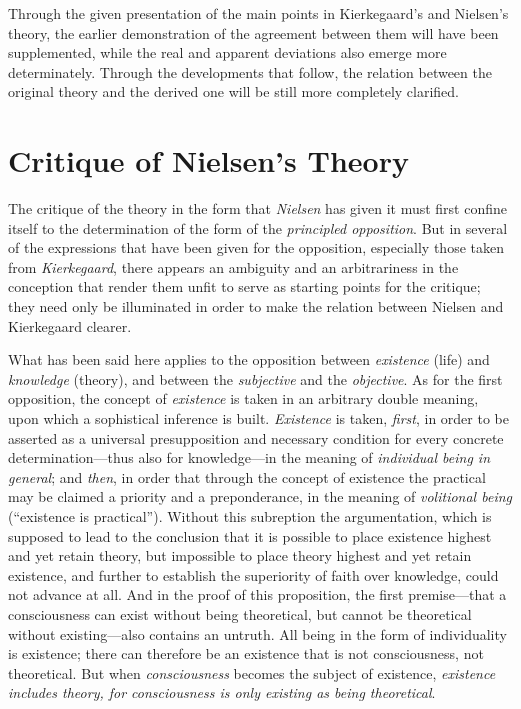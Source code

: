 \documentclass[12pt,a4paper]{book}
\begin{document}
Through the given presentation of the main points in Kierkegaard's and
Nielsen's theory, the earlier demonstration of the agreement between
them will have been supplemented, while the real and apparent deviations
also emerge more determinately. Through the developments that follow,
the relation between the original theory and the derived one will be
still more completely clarified.

\section{Critique of Nielsen's Theory}
\label{sec:nielsen-critique}

The critique of the theory in the form that \emph{Nielsen} has given it must
first confine itself to the determination of the form of the \emph{principled
opposition}. But in several of the expressions that have been given for
the opposition, especially those taken from \emph{Kierkegaard}, there appears
an ambiguity and an arbitrariness in the conception that render them
unfit to serve as starting points for the critique; they need only be
illuminated in order to make the relation between Nielsen and
Kierkegaard clearer.

What has been said here applies to the opposition between \emph{existence}
(life) and \emph{knowledge} (theory), and between the \emph{subjective} and the
\emph{objective}. As for the first opposition, the concept of \emph{existence} is
taken in an arbitrary double meaning, upon which a sophistical inference
is built. \emph{Existence} is taken, \emph{first}, in order to be asserted as a
universal presupposition and necessary condition for every concrete
determination---thus also for knowledge---in the meaning of \emph{individual
being in general}; and \emph{then}, in order that through the concept of
existence the practical may be claimed a priority and a preponderance,
in the meaning of \emph{volitional being} (``existence is practical''). Without
this subreption the argumentation, which is supposed to lead to the
conclusion that it is possible to place existence highest and yet retain
theory, but impossible to place theory highest and yet retain existence,
and further to establish the superiority of faith over knowledge, could
not advance at all. And in the proof of this proposition, the first
premise---that a consciousness can exist without being theoretical, but
cannot be theoretical without existing---also contains an untruth. All
being in the form of individuality is existence; there can therefore be
an existence that is not consciousness, not theoretical. But when
\emph{consciousness} becomes the subject of existence, \emph{existence includes
theory, for consciousness is only existing as being theoretical}.
\end{document}
